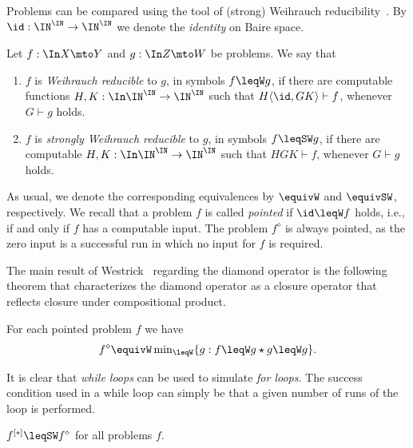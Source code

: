 \documentclass{lmcs}
\begin{document}
Problems can be compared using the tool of (strong) Weihrauch reducibility~\cite{BGP21}.
By $\id:\IN^\IN\to\IN^\IN$ we denote the {\em identity} on Baire space.

\begin{defi}
Let $f:\In X\mto Y$ and $g:\In Z\mto W$ be problems. We say that
\begin{enumerate}
\item $f$ is {\em Weihrauch reducible} to $g$, in symbols $f\leqW g$, if there are computable functions
         ${H,K:\In\IN^\IN\to\IN^\IN}$ such that $H\langle\id,GK\rangle\vdash f$, whenever $G\vdash g$ holds. 
\item $f$ is {\em strongly Weihrauch reducible} to $g$, in symbols $f\leqSW g$, if there are computable
         $H,K:\In\IN^\IN\to\IN^\IN$ such that $HGK\vdash f$, whenever $G\vdash g$ holds. 
\end{enumerate}
\end{defi}

\noindent
As usual, we denote the corresponding equivalences by $\equivW$ and $\equivSW$, respectively. 
We recall that a problem $f$ is called {\em pointed} if $\id\leqW f$ holds, i.e., if and only if $f$ has a computable input.
The problem $f^\diamond$ is always pointed, as the zero input is a successful run in which no input for $f$ is required.

The main result of Westrick~\cite{Wes21} regarding the diamond operator is the following theorem
that characterizes the diamond operator as a closure operator that reflects closure under
compositional product.

\begin{thm}[Westrick 2021]
\label{them:Westrick}
For each pointed problem $f$ we have
\[f^\diamond\equivW\min\nolimits_{\leqW}\{g:f\leqW g\star g\leqW g\}.\]
\end{thm}

\noindent
It is clear that {\em while loops} can be used to simulate {\em for loops}. 
The success condition used in a while loop can simply be that a given number
of runs of the loop is performed.

\begin{prop}
\label{prop:for-while}
$f^{[*]}\leqSW f^\diamond$ for all problems $f$.
\end{prop}
\end{document}
